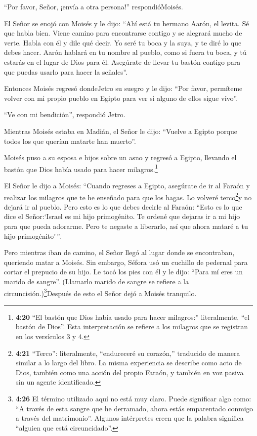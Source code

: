  ``Por favor, Señor, ¡envía a otra persona!''
respondióMoisés.

 El Señor se enojó con Moisés y le dijo: ``Ahí está tu
hermano Aarón, el levita. Sé que habla bien. Viene camino para
encontrarse contigo y se alegrará mucho de verte.  Habla
con él y dile qué decir. Yo seré tu boca y la suya, y te diré lo que
debes hacer.  Aarón hablará en tu nombre al pueblo, como si
fuera tu boca, y tú estarás en el lugar de Dios para él. 
Asegúrate de llevar tu bastón contigo para que puedas usarlo para hacer
la señales''.

 Entonces Moisés regresó dondeJetro su suegro y le dijo:
``Por favor, permíteme volver con mi propio pueblo en Egipto para ver si
alguno de ellos sigue vivo''.

``Ve con mi bendición'', respondió Jetro.

 Mientras Moisés estaba en Madián, el Señor le dijo:
``Vuelve a Egipto porque todos los que querían matarte han muerto''.

 Moisés puso a su esposa e hijos sobre un asno y regresó a
Egipto, llevando el bastón que Dios había usado para hacer
milagros.\footnote{\textbf{4:20} ``El bastón que Dios había usado para
  hacer milagros:'' literalmente, ``el bastón de Dios''. Esta
  interpretación se refiere a los milagros que se registran en los
  versículos 3 y 4.}

 El Señor le dijo a Moisés: ``Cuando regreses a Egipto,
asegúrate de ir al Faraón y realizar los milagros que te he enseñado
para que los hagas. Lo volveré terco\footnote{\textbf{4:21} ``Terco'':
  literalmente, ``endureceré su corazón,'' traducido de manera similar a
  lo largo del libro. La misma experiencia se describe como acto de
  Dios, también como una acción del propio Faraón, y también en voz
  pasiva sin un agente identificado.}y no dejará ir al pueblo.
 Pero esto es lo que debes decirle al Faraón: ``Esto es lo
que dice el Señor:`Israel es mi hijo primogénito.  Te
ordené que dejaras ir a mi hijo para que pueda adorarme. Pero te negaste
a liberarlo, así que ahora mataré a tu hijo primogénito'\,''.

 Pero mientras iban de camino, el Señor llegó al lugar
donde se encontraban, queriendo matar a Moisés.  Sin
embargo, Séfora usó un cuchillo de pedernal para cortar el prepucio de
su hijo. Le tocó los pies con él y le dijo: ``Para mí eres un marido de
sangre''.  (Llamarlo marido de sangre se refiere a la
circuncisión.)\footnote{\textbf{4:26} El término utilizado aquí no está
  muy claro. Puede significar algo como: ``A través de esta sangre que
  he derramado, ahora estás emparentado conmigo a través del
  matrimonio''. Algunos intérpretes creen que la palabra significa
  ``alguien que está circuncidado''.}Después de esto el Señor dejó a
Moisés tranquilo.

